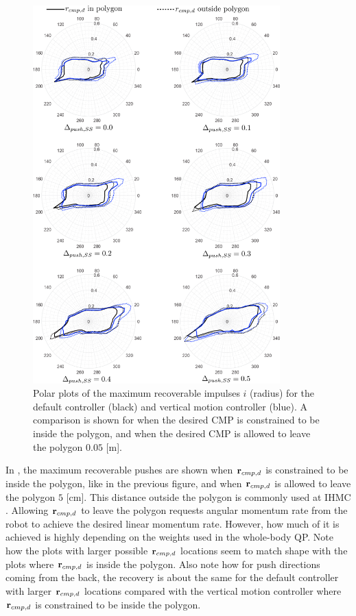\begin{figure}
     \centering
        \includegraphics[width=0.85\textwidth]{STYLESTUFF/roundAng.png}
        \caption{Polar plots of the maximum recoverable impulses $i$ (radius) for the default controller (black) and vertical motion controller (blue). A comparison is shown for when the desired \ac{CMP} is constrained to be inside the polygon, and when the desired \ac{CMP} is allowed to leave the polygon $0.05$ [m].}
        \label{fig:roundPushAng}
\end{figure}

In , the maximum recoverable pushes are shown when $\mathbf{r}_{cmp,d}$ is constrained to be inside the polygon, like in the previous figure, and when $\mathbf{r}_{cmp,d}$ is allowed to leave the polygon $5$ [cm]. This distance outside the polygon is commonly used at \ac{IHMC} \cite{griffin2017natural}. Allowing $\mathbf{r}_{cmp,d}$ to leave the polygon requests angular momentum rate from the robot to achieve the desired linear momentum rate. However, how much of it is achieved is highly depending on the weights used in the whole-body \ac{QP}. Note how the plots with larger possible $\mathbf{r}_{cmp,d}$ locations seem to match shape with the plots where $\mathbf{r}_{cmp,d}$ is inside the polygon. Also note how for push directions coming from the back, the recovery is about the same for the default controller with larger $\mathbf{r}_{cmp,d}$ locations compared with the vertical motion controller where $\mathbf{r}_{cmp,d}$ is constrained to be inside the polygon.

